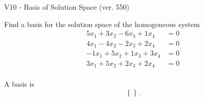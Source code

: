 \begin{exercise}
  \begin{exerciseTitle}V10 - Basis of Solution Space (ver. 550)\end{exerciseTitle}
  \begin{exerciseStatement}
    Find a basis for the solution space of the homogeneous system 
\begin{align*}
 5 x_ 1 + 3 x_ 2 -6 x_ 3 + 1 x_ 4 &= 0  \\ 
  4 x_ 1 -4 x_ 2 -2 x_ 3 + 2 x_ 4 &= 0  \\ 
  -1 x_ 1 + 5 x_ 2 + 1 x_ 3 + 3 x_ 4 &= 0  \\ 
  3 x_ 1 + 5 x_ 2 + 2 x_ 3 + 2 x_ 4 &= 0  \\ 
 \end{align*}


 
  \end{exerciseStatement}

  \begin{exerciseAnswer}
   A basis is   
\[\left\{\right\}.\]

  


  \end{exerciseAnswer}
\end{exercise}